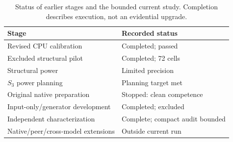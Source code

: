\begin{table}[t]\centering\footnotesize
\caption{Status of earlier stages and the bounded current study. Completion describes execution, not an evidential upgrade.}\label{tab:prospective-stages}
\begin{tabular}{ll}\toprule Stage & Recorded status \\
\midrule
Revised CPU calibration & Completed; passed \\
Excluded structural pilot & Completed; 72 cells \\
Structural power & Limited precision \\
$S_3$ power planning & Planning target met \\
Original native preparation & Stopped: clean competence \\
Input-only/generator development & Completed; excluded \\
Independent characterization & Complete; compact audit bounded \\
Native/peer/cross-model extensions & Outside current run \\
\bottomrule\end{tabular}\end{table}
